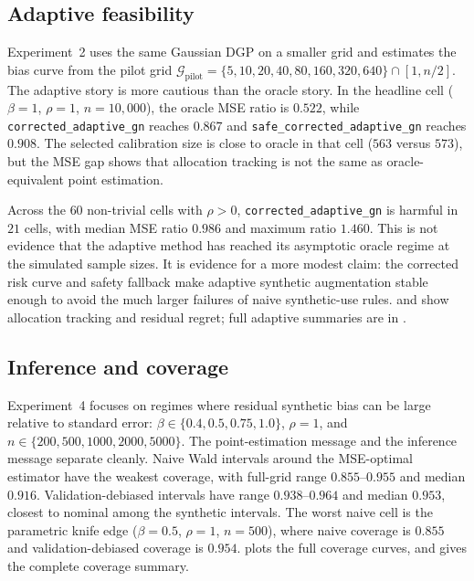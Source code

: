 \subsection{Adaptive feasibility}\label{ssec:exp2}

Experiment~2 uses the same Gaussian DGP on a smaller grid and estimates the bias curve from the pilot grid $\mathcal{G}_{\mathrm{pilot}}=\{5,10,20,40,80,160,320,640\}\cap[1,n/2]$. The adaptive story is more cautious than the oracle story. In the headline cell ($\beta=1$, $\rho=1$, $n=10{,}000$), the oracle MSE ratio is $0.522$, while \texttt{corrected\_adaptive\_gn} reaches $0.867$ and \texttt{safe\_corrected\_adaptive\_gn} reaches $0.908$. The selected calibration size is close to oracle in that cell ($563$ versus $573$), but the MSE gap shows that allocation tracking is not the same as oracle-equivalent point estimation.

Across the $60$ non-trivial cells with $\rho>0$, \texttt{corrected\_adaptive\_gn} is harmful in $21$ cells, with median MSE ratio $0.986$ and maximum ratio $1.460$. This is not evidence that the adaptive method has reached its asymptotic oracle regime at the simulated sample sizes. It is evidence for a more modest claim: the corrected risk curve and safety fallback make adaptive synthetic augmentation stable enough to avoid the much larger failures of naive synthetic-use rules.  and  show allocation tracking and residual regret; full adaptive summaries are in .

\subsection{Inference and coverage}\label{ssec:exp4}

Experiment~4 focuses on regimes where residual synthetic bias can be large relative to standard error: $\beta\in\{0.4,0.5,0.75,1.0\}$, $\rho=1$, and $n\in\{200,500,1000,2000,5000\}$. The point-estimation message and the inference message separate cleanly. Naive Wald intervals around the MSE-optimal estimator have the weakest coverage, with full-grid range $0.855$--$0.955$ and median $0.916$. Validation-debiased intervals have range $0.938$--$0.964$ and median $0.953$, closest to nominal among the synthetic intervals. The worst naive cell is the parametric knife edge ($\beta=0.5$, $\rho=1$, $n=500$), where naive coverage is $0.855$ and validation-debiased coverage is $0.954$.  plots the full coverage curves, and  gives the complete coverage summary.

